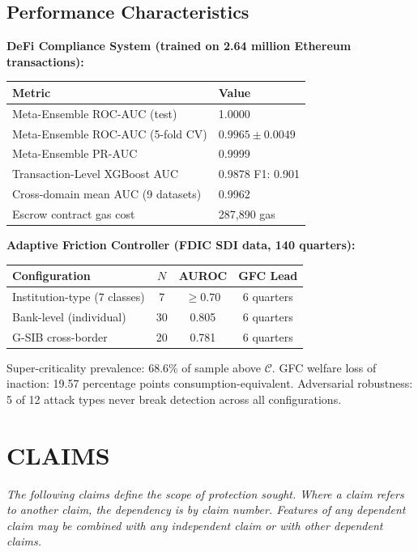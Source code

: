 \documentclass[12pt,a4paper]{article}
\begin{document}
\subsection{Performance Characteristics}

\textbf{DeFi Compliance System (trained on 2.64 million Ethereum
transactions):}
\begin{center}
\begin{tabular}{ll}
\toprule
\textbf{Metric} & \textbf{Value} \\
\midrule
Meta-Ensemble ROC-AUC (test) & 1.0000 \\
Meta-Ensemble ROC-AUC (5-fold CV) & $0.9965\pm0.0049$ \\
Meta-Ensemble PR-AUC & 0.9999 \\
Transaction-Level XGBoost AUC & 0.9878 \quad F1: 0.901 \\
Cross-domain mean AUC (9 datasets) & 0.9962 \\
Escrow contract gas cost & 287,890 gas \\
\bottomrule
\end{tabular}
\end{center}

\textbf{Adaptive Friction Controller (FDIC SDI data, 140 quarters):}
\begin{center}
\begin{tabular}{lccc}
\toprule
\textbf{Configuration} & $N$ & \textbf{AUROC} & \textbf{GFC Lead} \\
\midrule
Institution-type (7 classes) & 7 & $\geq0.70$ & 6 quarters \\
Bank-level (individual) & 30 & 0.805 & 6 quarters \\
G-SIB cross-border & 20 & 0.781 & 6 quarters \\
\bottomrule
\end{tabular}
\end{center}

Super-criticality prevalence: 68.6\% of sample above $\mathcal{C}$.
GFC welfare loss of inaction: 19.57 percentage points
consumption-equivalent. Adversarial robustness: 5 of 12 attack types never
break detection across all configurations.

\section{CLAIMS}

\noindent\textit{The following claims define the scope of protection
sought. Where a claim refers to another claim, the dependency is by claim
number. Features of any dependent claim may be combined with any independent
claim or with other dependent claims.}
\vspace{0.8em}
\end{document}
